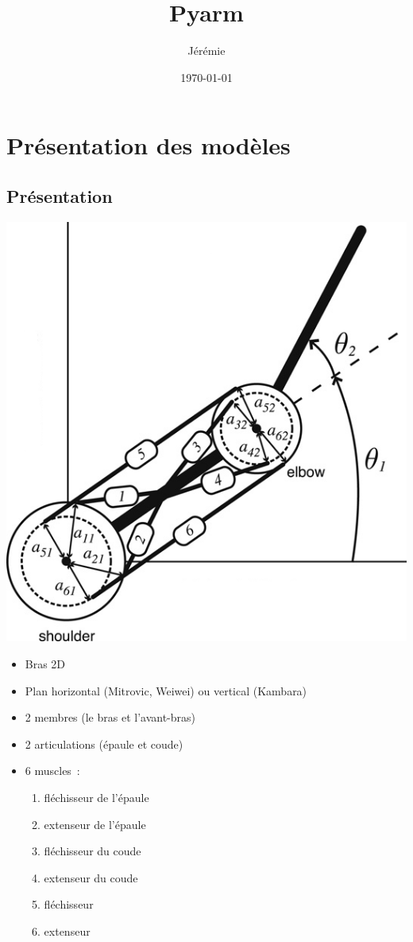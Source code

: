\documentclass[pdftex,a4paper,11pt]{article}
\numberwithin{equation}{subsection}
\begin{document}
\title{Pyarm}
\author{
	Jérémie 
}
\date{\today{}}

\maketitle


\section{Présentation des modèles}

\subsection{Présentation}

\begin{center}
        \includegraphics[width=.40\linewidth]{fig/arm}
\end{center}

\begin{itemize}
    \item Bras 2D
    \item Plan horizontal (Mitrovic, Weiwei) ou vertical (Kambara)
    \item 2 membres (le bras et l'avant-bras) %
    \item 2 articulations (épaule et coude)
    \item 6 muscles~:
    \begin{enumerate}
        \item fléchisseur de l'épaule
        \item extenseur de l'épaule
        \item fléchisseur du coude
        \item extenseur du coude
        \item fléchisseur
        \item extenseur
    \end{enumerate}
\end{itemize}
\end{document}
